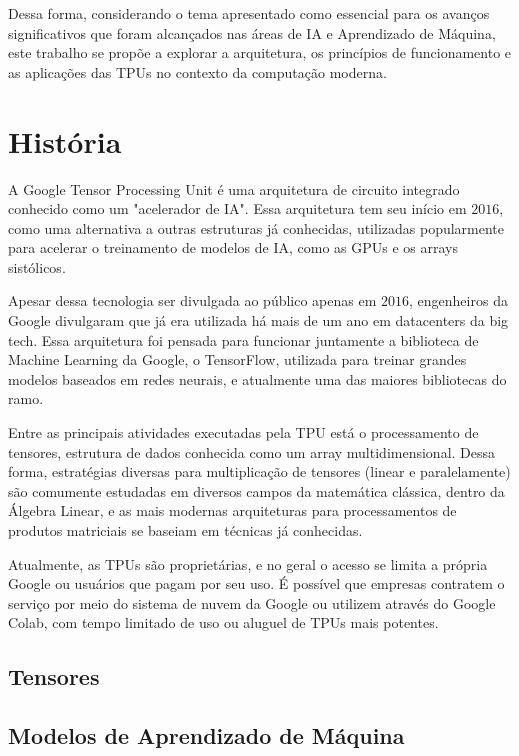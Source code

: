 \documentclass{report}
\begin{document}
Dessa forma, considerando o tema apresentado como essencial para os avanços significativos que foram alcançados nas áreas de IA e Aprendizado de Máquina, este trabalho se propõe a explorar a arquitetura, os princípios de funcionamento e as aplicações das TPUs no contexto da computação moderna. 

\chapter{História}

A Google Tensor Processing Unit é uma arquitetura de circuito integrado conhecido como um "acelerador de IA". Essa arquitetura tem seu início em $2016$, como uma alternativa a outras estruturas já conhecidas, utilizadas popularmente para acelerar o treinamento de modelos de IA, como as GPUs e os arrays sistólicos.

Apesar dessa tecnologia ser divulgada ao público apenas em $2016$, engenheiros da Google divulgaram que já era utilizada há mais de um ano em datacenters da big tech. Essa arquitetura foi pensada para funcionar juntamente a biblioteca de Machine Learning da Google, o TensorFlow, utilizada para treinar grandes modelos baseados em redes neurais, e atualmente uma das maiores bibliotecas do ramo. 

Entre as principais atividades executadas pela TPU está o processamento de tensores, estrutura de dados conhecida como um array multidimensional. Dessa forma, estratégias diversas para multiplicação de tensores (linear e paralelamente) são comumente estudadas em diversos campos da matemática clássica, dentro da Álgebra Linear, e as mais modernas arquiteturas para processamentos de produtos matriciais se baseiam em técnicas já conhecidas.

Atualmente, as TPUs são proprietárias, e no geral o acesso se limita a própria Google ou usuários que pagam por seu uso. É possível que empresas contratem o serviço por meio do sistema de nuvem da Google ou utilizem através do Google Colab, com tempo limitado de uso ou aluguel de TPUs mais potentes.

\section{Tensores}

\section{Modelos de Aprendizado de Máquina}
\end{document}
